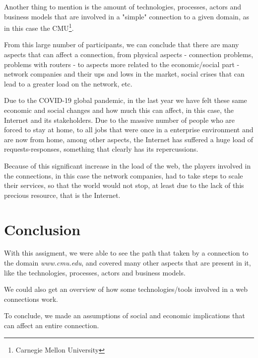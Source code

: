 \documentclass{article}
\newcommand\tab[1][1cm]{\hspace*{#1}}
\begin{document}
Another thing to mention is the amount of technologies, processes, actors and business models that are involved in a "simple" connection to a given domain, as in this case the CMU\footnote{Carnegie Mellon University}.

From this large number of participants, we can conclude that there are many aspects that can affect a connection, from physical aspects - connection problems, problems with routers - to aspects more related to the economic/social part - network companies and their ups and lows in the market, social crises that can lead to a greater load on the network, etc.

Due to the COVID-19 global pandemic, in the last year we have felt these same economic and social changes and how much this can affect, in this case, the Internet and its stakeholders. Due to the massive number of people who are forced to stay at home, to all jobs that were once in a enterprise environment and are now from home, among other aspects, the Internet has suffered a huge load of requests-responses, something that clearly has its repercussions.

Because of this significant increase in the load of the web, the players involved in the connections, in this case the network companies, had to take steps to scale their services, so that the world would not stop, at least due to the lack of this precious resource, that is the Internet.

\section{Conclusion}

\tab With this assigment, we were able to see the path that taken by a connection to the domain \textit{www.cmu.edu}, and covered many other aspects that are present in it, like the technologies, processes, actors and business models.

We could also get an overview of how some technologies/tools involved in a web connections work. 

To conclude, we made an assumptions of social and economic implications that can affect an entire connection.

\newpage

\nocite{*}
\printbibliography
\end{document}
